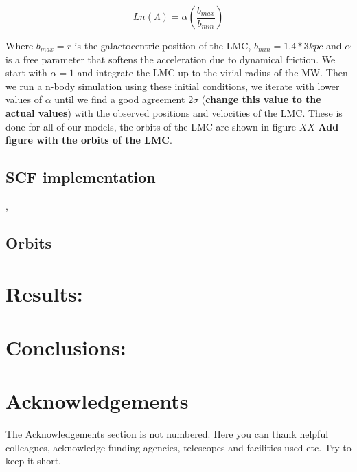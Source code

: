 \documentclass[a4paper,fleqn,usenatbib]{mnras}
\begin{document}
\begin{equation}
Ln(\Lambda) = \alpha \left( \dfrac{b_{max}}{b_{min}} \right)
\end{equation}

Where $b_{max} = r$ is the galactocentric position of the LMC,
$b_{min}=1.4 * 3 kpc$ and $\alpha$ is a free parameter that 
softens the acceleration due to dynamical friction. We start with 
$\alpha=1$ and integrate the LMC up to the virial radius of the MW. 
Then we run a n-body simulation using these initial conditions, 
we iterate with lower values of $\alpha$ until we find a good agreement 
$2 \sigma$ (\textbf{change this value to the actual values}) with the
 observed positions and velocities of the LMC. These is done for all 
of our models, the orbits of the LMC are shown in figure $XX$ 
\textbf{Add figure with the orbits of the LMC}.

\subsection{SCF implementation}
\citep{Hernquist92}, \citep{Weinberg95}

\subsection{Orbits}



\section{Results:}


\section{Conclusions:}



\section*{Acknowledgements}
The Acknowledgements section is not numbered. Here you can thank helpful
colleagues, acknowledge funding agencies, telescopes and facilities used etc.
Try to keep it short.



\end{document}

